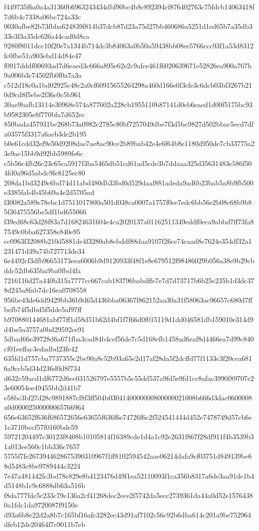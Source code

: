 {f449735f6a0a4a31360b6963243434dbf90bc4b8c892394cf876402763c75fdcb14063418f7d6b4c7338a06bc724a33c
0030afbe82b73fbba624839f814b37dcb87d23a75d27bb460686a5251d1ed65b7a35db333e3f3a35dc626a44cad0d8ca
9280f8011dcc10f20e7a1344b714dc3b84063a0b50a59438bb08ee5766ccc93f1a53d8312fc0fbe51a903ebd14d84e47
f0917dddf00693ad7d6eaed3c666a895e62e2c9afce461f6020639671e52826ea900a767b9a006b3c74502fb0f0a7a3a
c512d18c0a1bd02925c48c2a0cf60915655264298a460d166e0f3cfe3c6dcb03bf3267b210d9cd8f5ebe2f36c0c5b961
30ae9bafb13114e30968e574a877602a228cb1955110b87141d0eb6eaed1d00f5175bc93b9582305e8f770bfa7d652ec
850bada457931bc268b73a0982c2785c80bf7257049dbe7f3d5bc9827d502bbac5ecd7dfa03575f3317a6aeb3de2b195
b0e61cdd32ef9e50d9208dae7ae8ac90ce2b89bab42e4e6f64b8e1180d950de7cb33775a23e9ae15bb9d92bb5989fe6c
c5b56c4fb26c23c65ca5917f3ba5465db51cd61ad5cde3b7ddaaa325d35631483e586f504fd0a96d5abdc9fe8125ec80
208da1bd3249c6bd74d11abd480db33bd0d529daaf881adeda9ad6b23bab5a8b9fb500e3385fab4b45b69a4e2d5705ad
f30082a589e78ebc1d7511017800a501d038ca0007a1757f0ee7edc6bb56e2b08c68b9b85f36475556be5df1bd655066
f39ed68c63d28f83a7d16824631604e4ca2020137a01162511349eddf0eca9abbd7ff73fa87549c0bba627358e840e95
cc0963f32088b210d5881de4f3280ab8ebddf88daa9107f26ce74caad8e7624e354df32a1231471d39a74b727713de34
6e4492cf3dfb96653173eea6006b9d9120933f48f1e8e679512f98486029b056a38e9b29cbddc52db635ba9ba0fbd4fa
7216116d27a440b315a7777cc667cab183796babdffe7e7d7d73717b6b25e235b1d3dc378d245a8fab7dc16ea0708558
956be43de6dd9429bb36b9d65d436bba06367f862152aa30a31f58063ac96657c680d7ffbefb74f5dbd5f5dde5af97ff
b970880144681abf77ff1d58d51b62d4bf1f7f66d0f015119d1dd046581db159010e314d9d4be5a3757a0bd29592ce91
5dbad66e39728d6a671fba3cad84b4cef56de7c5d168efb1458ad6eaf8d4466ea7d99c840cf01eeffac3edadbd23fe42
635fd1d757cba7737355c2be90a8c52b93a65e2d17af28da5f2dcffd77f1133c3f20cea6816a9ccb5d34d236d0d8f734
d632c59acd1df6772d6ec031526797e5557b5c55dd537a9fd5e9fd1cc8afac3990f89707e23e60054ee49455bb2d41b7
e58bc3bf27d28c9891887cf8f3ff504b0304140000000800000021008b666d3dac0600008a0d00002500000065766964
656e63652f636f686572656e63655f636f6e74726f6c2f524541444d452e7478749d57cb6e1c3710bccf57f0160bde59
59721204497c30123f8408b10105814f16389cde1d4a1c92e2631f867f28df911f4b3539b31a013ee560c1bb336c7657
5755f7fe2673944628675390310967f1ff8102594542aae06214dafa9cf03751d849139be68d5483c8be9789444c3224
7e47a481442fc3bd78c829e8b4123476d49f1ea52110093f1ca356b8317a6de3aa91de1b4d5148b1c9c6888db63a516b
f8da777fdc5c233c79e136a2cf41268dec2ece2f5742da5ecc2739361da44a0d52e15764380a1fdc1da9720087f9150e
d93a6b8e22d2a8b7c165bf16afc3282ec43d91af7102c56c92b6dba614c201a9be752964dfeb12de20464f7e9011b7eb
}
